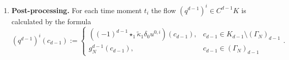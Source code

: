 \begin{algorithm}
\begin{enumerate}
\begin{itemize}
          the solution $\overline{x}^{i + 1}$ on the non-Dirichlet nodes
          (allocated only once, there is no need to store it on every step),
          \begin{equation}
            \overline{x}^{i + 1} := \overline{w_\tau}^i + \overline{z_\tau};
          \end{equation}
        \item
          the final solution
          \begin{equation}
            x^{i + 1}_j :=
            \begin{cases}
              \overline{x}^{i + 1}_j, & j \in J \\
              g_D^0(N_j), & j \in I
            \end{cases}.
          \end{equation}
      \end{itemize}
    \item
      \textbf{Post-processing.}
      For each time moment $t_i$ the flow $(q^{d - 1})^i \in C^{d - 1} K$
      is calculated by the formula
      \begin{equation}
        (q^{d - 1})^i(c_{d - 1}) :=
        \begin{cases}
          ((-1)^{d - 1} \star_1 \tilde{\kappa}_1 \delta_0 u^{0,i})(c_{d - 1}),
            & c_{d - 1} \in K_{d - 1} \setminus (\Gamma_N)_{d - 1} \\
          g_N^{d - 1}(c_{d - 1}), & c_{d - 1} \in (\Gamma_N)_{d - 1}
        \end{cases}.
      \end{equation}
  \end{enumerate}
\end{algorithm}
